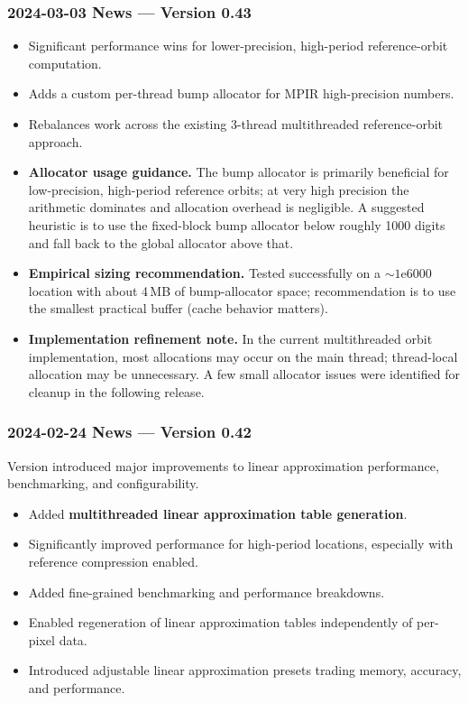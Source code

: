 \subsubsection{2024-03-03 News --- Version 0.43}
\begin{itemize}
  
  \item Significant performance wins for lower-precision, high-period
  reference-orbit computation.
  
  \item Adds a custom per-thread bump allocator for MPIR high-precision numbers.
  
  \item Rebalances work across the existing 3-thread multithreaded
  reference-orbit approach.

  \item \textbf{Allocator usage guidance.} The bump allocator is primarily
  beneficial for low-precision, high-period reference orbits; at very high
  precision the arithmetic dominates and allocation overhead is negligible. A
  suggested heuristic is to use the fixed-block bump allocator below roughly
  1000 digits and fall back to the global allocator above that.

  \item \textbf{Empirical sizing recommendation.} Tested successfully on a $\sim
  1\mathrm{e}{6000}$ location with about 4\,MB of bump-allocator space;
  recommendation is to use the smallest practical buffer (cache behavior matters).

  \item \textbf{Implementation refinement note.} In the current multithreaded
  orbit implementation, most allocations may occur on the main thread;
  thread-local allocation may be unnecessary. A few small allocator issues were
  identified for cleanup in the following release.

\end{itemize}


\subsubsection{2024-02-24 News --- Version 0.42}

Version  introduced major improvements to linear approximation performance, benchmarking, and configurability.

\begin{itemize}
  \item Added \textbf{multithreaded linear approximation table generation}.
  \item Significantly improved performance for high-period locations, especially with reference compression enabled.
  \item Added fine-grained benchmarking and performance breakdowns.
  \item Enabled regeneration of linear approximation tables independently of per-pixel data.
  \item Introduced adjustable linear approximation presets trading memory, accuracy, and performance.
\end{itemize}

